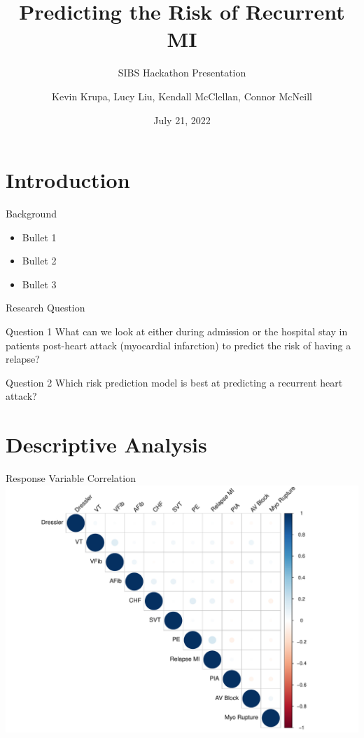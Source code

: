 \documentclass[
  ignorenonframetext,
]{beamer}
\title{Predicting the Risk of Recurrent MI}
\subtitle{SIBS Hackathon Presentation}
\author{Kevin Krupa, Lucy Liu, Kendall McClellan, Connor McNeill}
\date{July 21, 2022}
\institute{NCSU-Duke Summer Institute in Biostatistics}
\begin{document}
\frame{\titlepage}

\hypertarget{introduction}{%
\section{Introduction}\label{introduction}}

\begin{frame}{Background}
\protect\hypertarget{background}{}
\begin{itemize}
\item
  Bullet 1
\item
  Bullet 2
\item
  Bullet 3
\end{itemize}
\end{frame}

\begin{frame}{Research Question}
\protect\hypertarget{research-question}{}
\begin{block}{Question 1}
What can we look at either during admission or the hospital stay in patients post-heart attack (myocardial infarction) to predict the risk of having a relapse?
\end{block}

\begin{block}{Question 2}
Which risk prediction model is best at predicting a recurrent heart attack?
\end{block}
\end{frame}

\hypertarget{descriptive-analysis}{%
\section{Descriptive Analysis}\label{descriptive-analysis}}

\begin{frame}{Response Variable Correlation}
\protect\hypertarget{response-variable-correlation}{}
\includegraphics{sibs-hackathon-presentation_files/figure-beamer/ResVarCorrPlot-1.pdf}
\end{frame}
\end{document}
